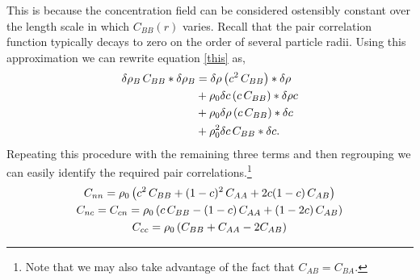 %
This is because the concentration field can be considered ostensibly constant
over the length scale in which $C_{BB}(r)$ varies. Recall that the pair
correlation function typically decays to zero on the order of several particle
radii. Using this approximation we can rewrite equation \ref{this} as,
%
\begin{align}
  \delta \rho_B \, C_{BB} \ast \delta \rho_B &= \delta \rho \left(c^2 \,C_{BB}\right) \ast \delta \rho \nonumber\\
                             &+ \rho_0 \delta c \left(c \,C_{BB}\right) \ast \delta \rho c \\
                             &+ \rho_0 \delta \rho \left(c \,C_{BB}\right) \ast \delta c \nonumber\\
                             &+ \rho_0^2 \delta c \,C_{BB} \ast \delta c. \nonumber
\end{align}
%
Repeating this procedure with the remaining three terms and then regrouping we
can easily identify the required pair correlations.\footnote{Note that we may
also take advantage of the fact that $C_{AB} = C_{BA}$.}
%
\begin{gather}
  C_{nn} = \rho_0 \left( c^2 \, C_{BB} + (1 - c)^2 \, C_{AA} + 2c(1-c)\,C_{AB}\right) \\
  C_{nc} = C_{cn} = \rho_0 \left( c\,C_{BB} - (1-c)\,C_{AA} + (1 - 2c) \, C_{AB} \right) \\
  C_{cc} = \rho_0 \left( C_{BB} + C_{AA} - 2 C_{AB} \right)
\end{gather}

